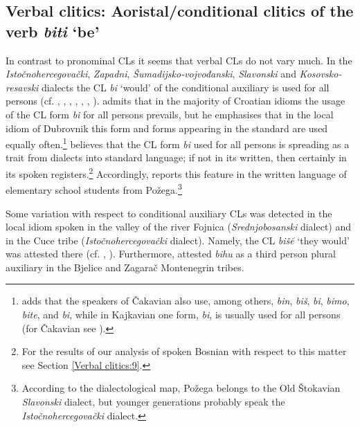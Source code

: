 
\subsection{Verbal clitics: Aoristal/conditional clitics of the verb \textit{biti} ‘be’}
\label{Verbal clitics:8}
In contrast to pronominal CLs it seems that verbal CLs do not vary much. In the \textit{Istočnohercegovački}, \textit{Zapadni}, \textit{Šumadijsko-vojvođanski}, \textit{Slavonski} and \textit{Kosovsko-resavski} dialects the CL \textit{bi} ‘would’ of the conditional auxiliary is used for all persons (cf. \citealt[331]{Peco07b}, \citealt[96]{KurtovicBudja09}, \citealt[302]{Radovanovic06}, \citealt[327]{Remetic85}, \citealt[377]{Dragicevic07}, \citealt[106]{Golic93}, \citealt[267]{Bukumiric03}). \citet[42]{Lisac12} admits that in the majority of Croatian idioms the usage of the CL form \textit{bi} for all persons prevails, but he emphasises that in the local idiom of Dubrovnik this form and forms appearing in the standard are used equally often.\footnote{\citet[42]{Lisac12} adds that the speakers of Čakavian also use, among others, \textit{bin}, \textit{biš}, \textit{bi}, \textit{bimo}, \textit{bite}, and \textit{bi}, while in Kajkavian one form, \textit{bi}, is usually used for all persons (for Čakavian see \citealt{Menac89}).} \citet[331]{Peco07b} believes that the CL form \textit{bi} used for all persons is spreading as a trait from dialects into standard language; if not in its written, then certainly in its spoken registers.\footnote{For the results of our analysis of spoken Bosnian with respect to this matter see Section \ref{Verbal clitics:9}.} Accordingly, \citet[165]{Aladrovic11} reports this feature in the written language of elementary school students from Požega.\footnote{According to the dialectological map, Požega belongs to the Old Štokavian \textit{Slavonski} dialect, but younger generations probably speak the \textit{Istočnohercegovački} dialect.}

Some variation with respect to conditional auxiliary CLs was detected in the local idiom spoken in the valley of the river Fojnica (\textit{Srednjobosanski} dialect) and in the Cuce tribe (\textit{Istočnohercegovački} dialect). Namely, the CL \textit{bišĕ} ‘they would’ was attested there (cf. \citealt[137]{Brozovic07}, \citealt[171]{Pesikan65}). Furthermore, \citet[171]{Pesikan65} attested \textit{bihu} as a third person plural auxiliary in the Bjelice and Zagarač Montenegrin tribes. 

